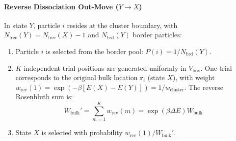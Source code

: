 \documentclass[final,5p,times,twocolumn]{elsarticle}
\begin{document}
\paragraph{Reverse Dissociation Out-Move ($Y \to X$)}
In state $Y$, particle $i$ resides at the cluster boundary, with $N_{\text{free}}(Y) = N_{\text{free}}(X) - 1$ and $N_{\text{brd}}(Y)$ border particles:
\begin{enumerate}
    \item Particle $i$ is selected from the border pool: $P(i) = 1 /
      N_{\text{brd}}(Y)$. 
    \item $K$ independent trial positions are generated uniformly in
      $V_{\text{box}}$. One trial corresponds to the original bulk
      location $\mathbf{r}_i$ (state $X$), with weight
      $w_{\text{rev}}(1) = \exp\left(-\beta [E(X) - E(Y)]\right) = 1 /
      w_{\text{cluster}}$. The reverse Rosenbluth sum is: 
    \begin{equation}
        W_{\text{bulk}}' = \sum_{m=1}^K w_{\text{rev}}(m) = \exp(\beta
        \Delta E) W_{\text{bulk}} 
    \end{equation}
    \item State $X$ is selected with probability $w_{\text{rev}}(1) /
      W_{\text{bulk}}'$. 
\end{enumerate}
\end{document}
